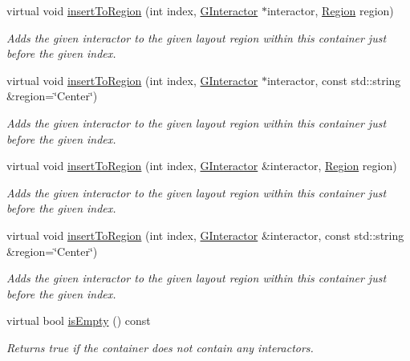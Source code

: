 \begin{DoxyCompactItemize}
virtual void \mbox{\hyperlink{classGContainer_a1c4b766b059991ad7d084ea03f22f1c5}{insert\+To\+Region}} (int index, \mbox{\hyperlink{classGInteractor}{G\+Interactor}} $\ast$interactor, \mbox{\hyperlink{classGContainer_a81a01a86de31071a92e6cce0bab9bc4b}{Region}} region)
\begin{DoxyCompactList}\small\item\em Adds the given interactor to the given layout region within this container just before the given index. \end{DoxyCompactList}\item 
virtual void \mbox{\hyperlink{classGContainer_adeeb03feb9346a9cf2046427484c20bc}{insert\+To\+Region}} (int index, \mbox{\hyperlink{classGInteractor}{G\+Interactor}} $\ast$interactor, const std\+::string \&region=\char`\"{}Center\char`\"{})
\begin{DoxyCompactList}\small\item\em Adds the given interactor to the given layout region within this container just before the given index. \end{DoxyCompactList}\item 
virtual void \mbox{\hyperlink{classGContainer_a1be2b263cd8d28e61e136a19d8e935cc}{insert\+To\+Region}} (int index, \mbox{\hyperlink{classGInteractor}{G\+Interactor}} \&interactor, \mbox{\hyperlink{classGContainer_a81a01a86de31071a92e6cce0bab9bc4b}{Region}} region)
\begin{DoxyCompactList}\small\item\em Adds the given interactor to the given layout region within this container just before the given index. \end{DoxyCompactList}\item 
virtual void \mbox{\hyperlink{classGContainer_ad4d413f64a3e4fb948956e7249c10110}{insert\+To\+Region}} (int index, \mbox{\hyperlink{classGInteractor}{G\+Interactor}} \&interactor, const std\+::string \&region=\char`\"{}Center\char`\"{})
\begin{DoxyCompactList}\small\item\em Adds the given interactor to the given layout region within this container just before the given index. \end{DoxyCompactList}\item 
virtual bool \mbox{\hyperlink{classGContainer_acf82f9b2937375c7b1cf3dccb3df3312}{is\+Empty}} () const
\begin{DoxyCompactList}\small\item\em Returns true if the container does not contain any interactors. \end{DoxyCompactList}\item 

\end{DoxyCompactItemize}
